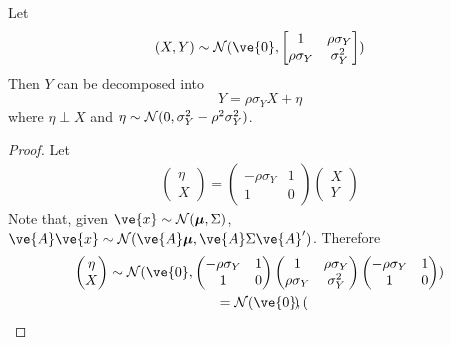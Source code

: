 \documentclass[11pt]{article}
\newcommand{\bm}[1]{\boldsymbol{#1}}
\begin{document}
			
			\begin{theorem}
				Let 
				\begin{equation}
					(X, Y) \sim \mc{N}(\ve{0}, \begin{bmatrix}1 & \rho \sigma_Y \\ \rho \sigma_Y & \sigma_Y^2 \end{bmatrix})	
				\end{equation}
				Then $Y$ can be decomposed into
				\begin{equation}
					Y = \rho \sigma_Y X + \eta
				\end{equation}
				where $\eta \perp X$ and $\eta \sim \mathcal{{N}}(0, \sigma_Y^2 - \rho^2 \sigma_Y^2)$.
				\begin{proof}
					Let 
					\begin{gather}
						\begin{pmatrix}
							\eta \\ X
						\end{pmatrix} 
						= \begin{pmatrix}
							- \rho \sigma_Y & 1 \\
							1 & 0
						\end{pmatrix}
						\begin{pmatrix}
							X \\ Y
						\end{pmatrix}
					\end{gather}
					Note that, given $\ve{x} \sim \mc{N}(\bm{\mu}, \Sigma)$, $\ve{A}\ve{x} \sim \mc{N}(\ve{A} \bm{\mu}, \ve{A}\Sigma \ve{A}')$. Therefore
					\begin{gather}
						\begin{pmatrix}
							\eta \\ X
						\end{pmatrix} \sim \mc{N}(
							\ve{0},
							\begin{pmatrix}
							- \rho \sigma_Y & 1 \\
							1 & 0
						\end{pmatrix} \begin{pmatrix}1 & \rho \sigma_Y \\ \rho \sigma_Y & \sigma_Y^2 \end{pmatrix}
						\begin{pmatrix}
							- \rho \sigma_Y & 1 \\
							1 & 0
						\end{pmatrix}
						) \\
						= \mc{N}(
							\ve{0},
							\begin{pmatrix}

\end{pmatrix}
\end{gather}
\end{proof}
\end{theorem}
\end{document}
